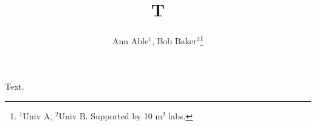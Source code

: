 \documentclass{article}
\begin{document}
\title{T}\author{Ann Able$^{1}$, Bob Baker$^{2}$\thanks{$^{1}$Univ A, $^{2}$Univ B. Supported by 10 m$^{2}$ labs.}}
\maketitle
Text.
\end{document}
